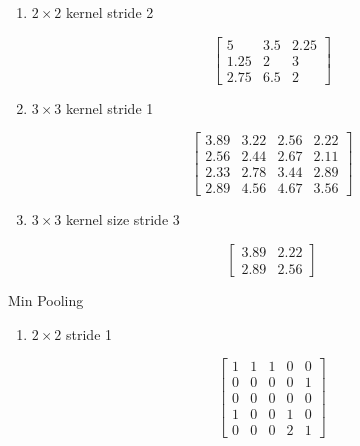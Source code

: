 \documentclass[12pt,a4paper]{article}
\begin{document}
\begin{enumerate}
\begin{enumerate}
\begin{enumerate}
                          \item $2\times 2$ kernel stride 2

                                \[
                                \begin{bmatrix}
                                  5 & 3.5 & 2.25 \\
                                  1.25 & 2 & 3 \\
                                  2.75 & 6.5 & 2
                                \end{bmatrix}
                                \]


                          \item $3 \times 3 $ kernel stride 1

                                \[
                                \begin{bmatrix}
                                  3.89 & 3.22 & 2.56 & 2.22 \\
                                  2.56 & 2.44 & 2.67 & 2.11 \\
                                  2.33 & 2.78 & 3.44 & 2.89 \\
                                  2.89 & 4.56 & 4.67 & 3.56
                                \end{bmatrix}
                                \]


                          \item $3 \times 3$ kernel size stride 3

                                \[
                                \begin{bmatrix}
                                  3.89 & 2.22 \\
                                  2.89 & 2.56
                                \end{bmatrix}
                                \]
                        \end{enumerate}


                                Min Pooling

                                \begin{enumerate}
                                  \item $2 \times 2$ stride 1

                                        \[
                                        \begin{bmatrix}
                                          1 & 1 & 1 & 0 & 0 \\
                                          0 & 0 & 0 & 0 & 1 \\
                                          0 & 0 & 0 & 0 & 0 \\
                                          1 & 0 & 0 & 1 & 0 \\
                                          0 & 0 & 0 & 2 & 1
                                        \end{bmatrix}
                                        \]



\end{enumerate}
\end{enumerate}
\end{enumerate}
\end{document}
